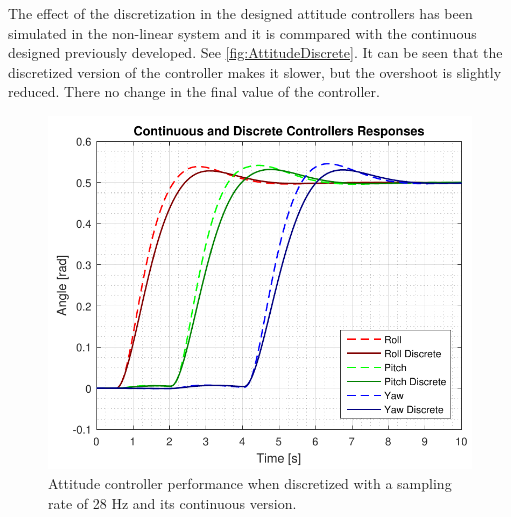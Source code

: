The effect of the discretization in the designed attitude controllers has been simulated in the non-linear system and it is commpared with the continuous designed previously developed. See \autoref{fig:AttitudeDiscrete}. It can be seen that the discretized version of the controller makes it slower, but the overshoot is slightly reduced. There no change in the final value of the controller.
\begin{figure}[H]
	\centering
	\includegraphics[scale=0.65]{figures/simAttitudeDiscrete}
	\caption{Attitude controller performance when discretized with a sampling rate of 28 Hz and its continuous version.}
	\label{fig:AttitudeDiscrete}
\end{figure}

